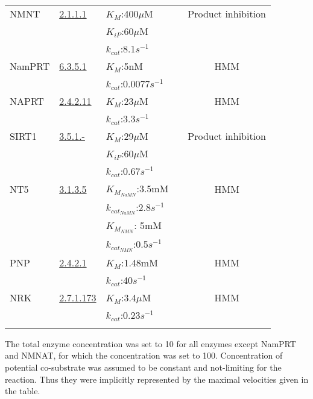 \documentclass[a4paper,10pt]{article}
\begin{document}
\begin{longtable}{p{3cm}p{2cm}p{3cm}cc}
    \\ \hline
NMNT & \href{http://www.chem.qmul.ac.uk/iubmb/enzyme/EC2/1/1/1.html}{2.1.1.1}
&$K_M$:400$\mu$M  & \cite{Aksoy1994} & Product inhibition\\
& & $K_{iP}$:60$\mu$M  & &
    \\
    & & $k_{cat}$:8.1$s^{-1}$  & \cite{Alston1988}&
    \\  \hline
NamPRT & \href{http://www.chem.qmul.ac.uk/iubmb/enzyme/EC6/3/5/1.html}{6.3.5.1}
&$K_M$:5nM  & \cite{Burgos2008} & HMM\\
    & & $k_{cat}$:0.0077$s^{-1}$  & &
    \\  \hline
    NAPRT &
       \href{http://www.chem.qmul.ac.uk/iubmb/enzyme/EC2/4/2/11.html}{2.4.2.11}
    &$K_M$:23$\mu$M  & \cite{Hanna1983} & HMM\\
    & & $k_{cat}$:3.3$s^{-1}$  & &
    \\  \hline
    SIRT1 &
    \href{http://www.chem.qmul.ac.uk/iubmb/enzyme/EC3/5/1/index.html}{3.5.1.-}
    &$K_M$:29$\mu$M  & \cite{Borra2004} & Product inhibition\\
    & & $K_{iP}$:60$\mu$M  & &
    \\
    & & $k_{cat}$:0.67$s^{-1}$  & &
    \\  \hline
    NT5 &
    \href{http://www.chem.qmul.ac.uk/iubmb/enzyme/EC3/1/3/5.html}{3.1.3.5}
    &$K_{M_{NaMN}}$:3.5mM  & \cite{Kulikova2015} & HMM \\
    & & $k_{{cat}_{NaMN}}$:2.8$s^{-1}$
    & & \\
    & &$K_{M_{NMN}}$: 5mM   &  \\
     & & $k_{{cat}_{NMN}}$:0.5$s^{-1}$
     & & \\  \hline
     PNP &
    \href{http://www.chem.qmul.ac.uk/iubmb/enzyme/EC3/2/4/2.html}{2.4.2.1}
    &$K_M$:1.48mM  & \cite{Wielgus-Kutrowska1997} & HMM \\
    & & $k_{cat}$:40$s^{-1}$
    & & \\  \hline
    NRK &
    \href{http://www.chem.qmul.ac.uk/iubmb/enzyme/EC2/7/1/173.html}{2.7.1.173}
    &$K_M$:3.4$\mu$M & \cite{Dolle2009} & HMM \\
    & & $k_{cat}$:0.23$s^{-1}$
    & & \\  \hline
  \bottomrule
  \label{tab:kinetic}
\end{longtable}

The total enzyme concentration was set to 10 for all enzymes except NamPRT and NMNAT, for which the concentration was set to 100. Concentration of potential co-substrate was assumed to be constant
and not-limiting for the reaction. Thus they were implicitly represented by the
maximal velocities given in the table.
\end{document}
